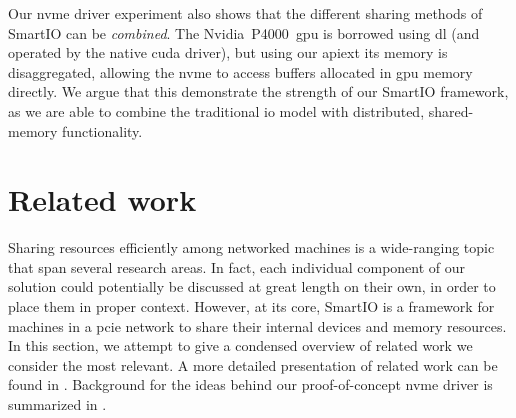 Our \gls{nvme} driver experiment also shows that the different sharing methods of SmartIO can be \emph{combined}. 
%
The Nvidia~P4000~\gls{gpu} is borrowed using \gls{dl} (and operated by the native \gls{cuda} driver), but using our \gls{apiext} its memory is \gls{disaggregated}, allowing the \gls{nvme} to access buffers allocated in \gls{gpu} memory directly.
%
We argue that this demonstrate the strength of our SmartIO framework, as we are able to combine the traditional \gls{io} model with distributed, shared-memory functionality.



\section{Related work}\label{sec:rw}
Sharing resources efficiently among networked machines is a wide-ranging topic that span several research areas.
%
In fact, each individual component of our solution could potentially be discussed at great length on their own, in order to place them in proper context.
%
However, at its core, SmartIO is a framework for machines in a \gls{pcie} network to share their internal devices and memory resources.
%
In this section, we attempt to give a condensed overview of related work we consider the most relevant.
%
A more detailed presentation of related work can be found in .
%
Background for the ideas behind our proof-of-concept \gls{nvme} driver is summarized in .


